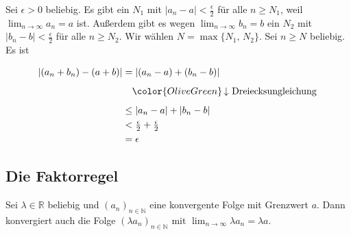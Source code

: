 \documentclass[fontsize=9pt,
               parskip=half-,
               DIV=14,
               listof=chapterentry,
               tocflat]{scrbook}
\begin{document}
\begin{proof*}
Sei $\epsilon >0$ beliebig. Es gibt ein $N_{1}$ mit $|a_{n}-a|<{\tfrac {\epsilon }{2}}$ für alle $n\geq N_{1}$, weil $\lim _{n\rightarrow \infty }a_{n}=a$ ist. Außerdem gibt es wegen $\lim _{n\to \infty }b_{n}=b$ ein $N_{2}$ mit $|b_{n}-b|<{\tfrac {\epsilon }{2}}$ für alle $n\geq N_{2}$. Wir wählen $N=\max\{N_{1},\,N_{2}\}$. Sei $n\geq N$ beliebig. Es ist

\begin{align*}
|(a_{n}+b_{n})-(a+b)|&=|(a_{n}-a)+(b_{n}-b)|\\[0.5em]&\quad {\color {OliveGreen}\left\downarrow \ {\text{Dreiecksungleichung}}\right.}\\[0.5em]&\leq |a_{n}-a|+|b_{n}-b|\\&<{\tfrac {\epsilon }{2}}+{\tfrac {\epsilon }{2}}\\&=\epsilon 
\end{align*}

\end{proof*}

\subsection{Die Faktorregel}

\begin{theorem*}
Sei $\lambda \in \mathbb {R} $ beliebig und $(a_{n})_{n\in \mathbb {N} }$ eine konvergente Folge mit Grenzwert $a$. Dann konvergiert auch die Folge $(\lambda a_{n})_{n\in \mathbb {N} }$ mit $\lim _{n\rightarrow \infty }\lambda a_{n}=\lambda a$.

\end{theorem*}
\end{document}
